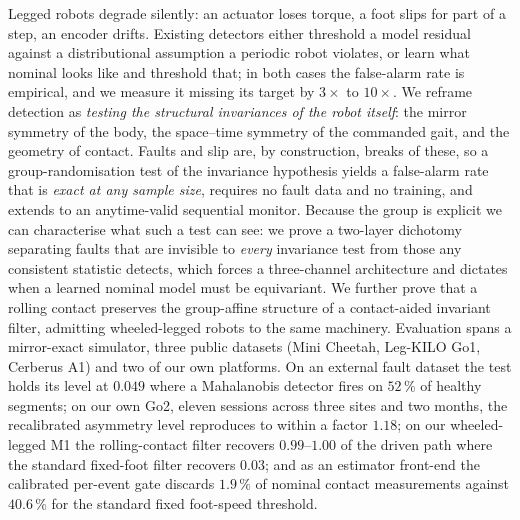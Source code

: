 Legged robots degrade silently: an actuator loses torque, a foot slips for part of a step, an encoder drifts. Existing
detectors either threshold a model residual against a distributional assumption a periodic robot violates, or learn what
nominal looks like and threshold that; in both cases the false-alarm rate is empirical, and we measure it missing its
target by $3\times$ to $10\times$. We reframe detection as \emph{testing the structural invariances of the robot
itself}: the mirror symmetry of the body, the space--time symmetry of the commanded gait, and the geometry of contact.
Faults and slip are, by construction, breaks of these, so a group-randomisation test of the invariance hypothesis yields
a false-alarm rate that is \emph{exact at any sample size}, requires no fault data and no training, and extends to an
anytime-valid sequential monitor. Because the group is explicit we can characterise what such a test can see: we prove a
two-layer dichotomy separating faults that are invisible to \emph{every} invariance test from those any consistent
statistic detects, which forces a three-channel architecture and dictates when a learned nominal model must be
equivariant. We further prove that a rolling contact preserves the group-affine structure of a contact-aided invariant
filter, admitting wheeled-legged robots to the same machinery. Evaluation spans a mirror-exact simulator, three public
datasets (Mini Cheetah, Leg-KILO Go1, Cerberus A1) and two of our own platforms. On an external fault dataset the test
holds its level at $0.049$ where a Mahalanobis detector fires on $52\,\%$ of healthy segments; on our own Go2, eleven
sessions across three sites and two months, the recalibrated asymmetry level reproduces to within a factor $1.18$; on
our wheeled-legged M1 the rolling-contact filter recovers $0.99$--$1.00$ of the driven path where the standard
fixed-foot filter recovers $0.03$; and as an estimator front-end the calibrated per-event gate discards $1.9\,\%$ of
nominal contact measurements against $40.6\,\%$ for the standard fixed foot-speed threshold.
